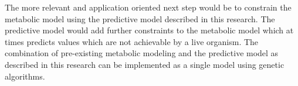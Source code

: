 \documentclass[12pt,chapterheads]{ucsd}
\begin{document}
The more relevant and application oriented next step would be to constrain the metabolic model using the predictive model described in this research. The predictive model would add further constraints to the metabolic model which at times predicts values which are not achievable by a live organism. The combination of pre-existing metabolic modeling and the predictive model as described in this research can be implemented as a single model using genetic algorithms.

\def\baselinestretch{1.0}  %
\end{document}
